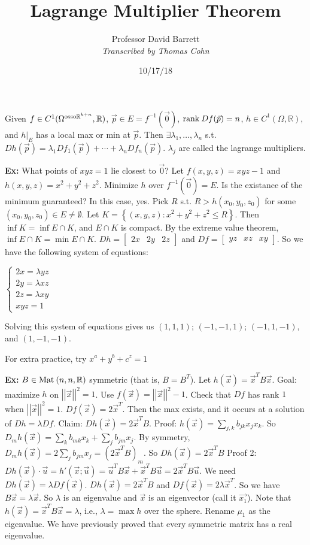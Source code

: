 \documentclass[10pt,letterpaper]{article}
\author{Professor David Barrett\\ \small\textit{Transcribed by Thomas Cohn}}
\title{Lagrange Multiplier Theorem}
\date{10/17/18} %
\newcommand{\n}{\hfill\break}
\newcommand{\ex}[1]{\par\noindent\settowidth{\hangindent}{\textbf{Ex: }}\textbf{Ex: }#1\n}
\newcommand{\ptxt}[1]{\textrm{\textnormal{#1}}}
\newcommand{\inlineeq}[1]{\centerline{$\displaystyle #1$}}
\newcommand{\set}[1]{\left\{#1\right\}}
\newcommand{\reals}{\mathbb{R}}
\newcommand{\R}{\reals}
\newcommand{\inv}{^{-1}}
\newcommand{\abs}[1]{\left|#1\right|}
\newcommand{\norm}[1]{\abs{\abs{#1}}}
\newcommand{\tpose}{^{T}}
\newcommand{\Mat}{\ptxt{Mat}\>}
\newcommand{\rank}{\ptxt{rank}\>}
\newcommand{\st}{s.t.}
\begin{document}
\maketitle
\setlength\RaggedRightParindent{\parindent}
\RaggedRight

\par\noindent Given $f\in{}C^{1}(\Omega^{\ptxt{osso}\R^{k+n}},\R)$, $\vec{p}\in{}E=f\inv(\vec{0})$, $\rank{}Df(\vec{p})=n$, $h\in{}C^{1}(\Omega,\R)$, and $h|_{E}$ has a local max or min at $\vec{p}$.\n
Then $\exists\lambda_{1},\ldots,\lambda_{n}$ \st{} $Dh(\vec{p})=\lambda_{1}Df_{1}(\vec{p})+\cdots+\lambda_{n}Df_{n}(\vec{p})$. $\lambda_{j}$ are called the lagrange multipliers.\n

\ex{What points of $xyz=1$ lie closest to $\vec{0}$?\n
Let $f(x,y,z)=xyz-1$ and $h(x,y,z)=x^{2}+y^{2}+z^{2}$. Minimize $h$ over $f\inv(\vec{0})=E$.\n
\n
Is the existance of the minimum guaranteed? In this case, yes. Pick $R$ \st{} $R>h(x_{0},y_{0},z_{0})$ for some $(x_{0},y_{0},z_{0})\in{}E\ne\emptyset$. Let $K=\set{(x,y,z):x^{2}+y^{2}+z^{2}\le{}R}$. Then $\inf{}K=\inf{}E\cap{}K$, and $E\cap{}K$ is compact. By the extreme value theorem, $\inf{}E\cap{}K=\min{}E\cap{}K$.\n
\n
$Dh=\left[\begin{array}{lll}2x & 2y & 2z\end{array}\right]$ and $Df=\left[\begin{array}{lll}yz & xz & xy\end{array}\right]$. So we have the following system of equations:\n
\inlineeq{\left\{\begin{array}{l}2x=\lambda{}yz\\ 2y=\lambda{}xz\\ 2z=\lambda{}xy\\ xyz=1\end{array}\right.}
Solving this system of equations gives us $(1,1,1)$; $(-1,-1,1)$; $(-1,1,-1)$, and $(1,-1,-1)$.}

\par\noindent For extra practice, try $x^{a}+y^{b}+c^{z}=1$\n

\ex{$B\in\Mat(n,n,\R)$ symmetric (that is, $B=B\tpose$).\n
Let $h(\vec{x})=\vec{x}\tpose{}B\vec{x}$. Goal: maximize $h$ on $\norm{\vec{x}}^{2}=1$. Use $f(\vec{x})=\norm{\vec{x}}^{2}-1$.\n
\n
Check that $Df$ has rank $1$ when $\norm{\vec{x}}^{2}=1$. $Df(\vec{x})=2\vec{x}\tpose$. Then the max exists, and it occurs at a solution of $Dh=\lambda{}Df$.\n
\n
Claim: $Dh(\vec{x})=2\vec{x}\tpose{}B$.\n
Proof: $h(\vec{x})=\sum_{j,k}b_{jk}x_{j}x_{k}$. So $D_{m}h(\vec{x})=\sum_{k}b_{mk}x_{k}+\sum_{j}b_{jm}x_{j}$.\n
By symmetry, $D_{m}h(\vec{x})=2\sum_{j}b_{jm}x_{j}=(2\vec{x}\tpose{}B)_{m}$. So $Dh(\vec{x})=2\vec{x}\tpose{}B$\n
Proof 2: $Dh(\vec{x})\cdot\vec{u}=h'(\vec{x};\vec{u})=\vec{u}\tpose{}B\vec{x}+\vec{x}\tpose{}B\vec{u}=2\vec{x}\tpose{}B\vec{u}$.\n
\n
We need $Dh(\vec{x})=\lambda{}Df(\vec{x})$. $Dh(\vec{x})=2\vec{x}\tpose{}B$ and $Df(\vec{x})=2\lambda\vec{x}\tpose$. So we have $B\vec{x}=\lambda\vec{x}$. So $\lambda$ is an eigenvalue and $\vec{x}$ is an eigenvector (call it $\vec{x_{1}}$).\n
\n
Note that $h(\vec{x})=\vec{x}\tpose{}B\vec{x}=\lambda$, i.e., $\lambda=\max{}h$ over the sphere. Rename $\mu_{1}$ as the eigenvalue.\n
\n
We have previously proved that every symmetric matrix has a real eigenvalue.}
\end{document}
